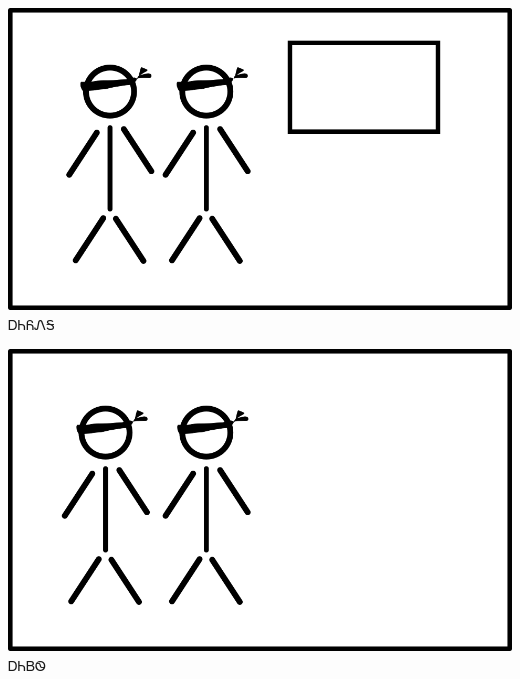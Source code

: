 \documentclass[avery5371]{flashcards}%
\begin{document}
    \begin{flashcard}{
        \includegraphics[width=0.95\columnwidth,height=.51\columnwidth,keepaspectratio]{../artwork/flags/aniyonega-flag-blind}
    }
        \Huge ᎠᏂᏲᏁᎦ
    \end{flashcard}

    \begin{flashcard}{
        \includegraphics[width=0.95\columnwidth,height=.51\columnwidth,keepaspectratio]{../artwork/flags/aniyvwi-no-flag-blind}
    }
        \Huge ᎠᏂᏴᏫ
    \end{flashcard}
\end{document}
